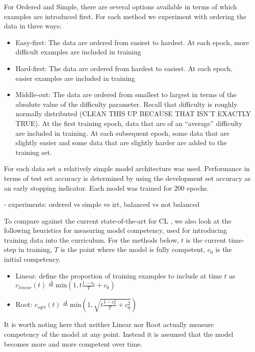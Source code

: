 \documentclass[letterpaper]{article} %
\begin{document}
For Ordered and Simple, there are several options available in terms of which examples are introduced first.
For each method we experiment with ordering the data in three ways:
\begin{itemize}
	\item 
	Easy-first: The data are ordered from easiest to hardest. At each epoch, more difficult examples are included in training
	\item 
	Hard-first: The data are ordered from hardest to easiest. At each epoch, easier examples are included in training
	\item 
	Middle-out: The data are ordered from smallest to largest in terms of the absolute value of the difficulty parameter. Recall that difficulty is roughly normally distributed (CLEAN THIS UP BECAUSE THAT ISN'T EXACTLY TRUE). At the first training epoch, data that are of an ``average'' difficulty are included in training. At each subsequent epoch, some data that are slightly easier and some data that are slightly harder are added to the training set.
\end{itemize}

For each data set a relatively simple model architecture was used.
Performance in terms of test set accuracy is determined by using the development set accuracy as an early stopping indicator.
Each model was trained for 200 epochs. 

- experiments: ordered vs simple vs irt, balanced vs not balanced

To compare against the current state-of-the-art for CL \cite{platanios_competence-based_2019}, we also look at the following heuristics for measuring model competency, used for introducing training data into the curriculum.
For the methods below, $t$ is the current time-step in training, $T$ is the point where the model is fully competent, $c_0$ is the initial competency. 

\begin{itemize}
	\item 
	Linear: define the proportion of training examples to include at time $t$ as $c_{linear}(t) \overset{\Delta}{=} \text{min} (1, t\frac{1-c_0}{T} + c_0)$
	\item 
	Root: $c_{sqrt}(t) \overset{\Delta}{=} \text{min}(1, \sqrt{t\frac{1-c_0^2}{T} + c_0^2})$
\end{itemize}

It is worth noting here that neither Linear nor Root actually measure competency of the model at any point. 
Instead it is assumed that the model becomes more and more competent over time.
\end{document}
